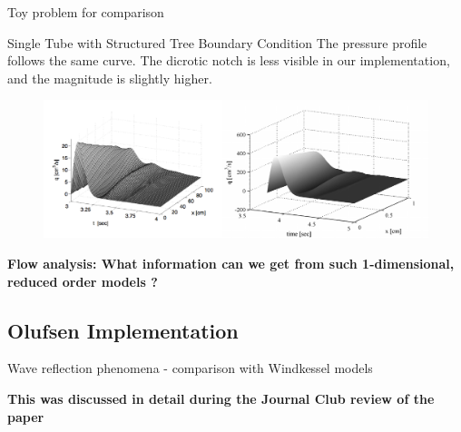 \documentclass{beamer}
\begin{document}
\begin{frame}{Toy problem for comparison}
\begin{block}{Single Tube with Structured Tree Boundary Condition}
	The pressure profile follows the same curve. The dicrotic notch is less visible in our implementation, and the magnitude is slightly higher. 
\end{block}
\vspace{-1.0cm}
\begin{figure}[ht]
	\centering
	\includegraphics[width=5.0in]{qplot-crop.pdf}
	\label{ours}
\end{figure}

\end{frame}


\begin{frame}
	\begin{center}
		\Large{\textbf{Flow analysis: What information can we get from such 1-dimensional, reduced order models ?}}
	\end{center}
\end{frame}

\subsection{Olufsen Implementation}

\begin{frame}{Wave reflection phenomena - comparison with Windkessel models}

\begin{center}
\textbf{This was discussed in detail during the Journal Club review of the paper}
\end{center}

\end{frame}

\end{document}
